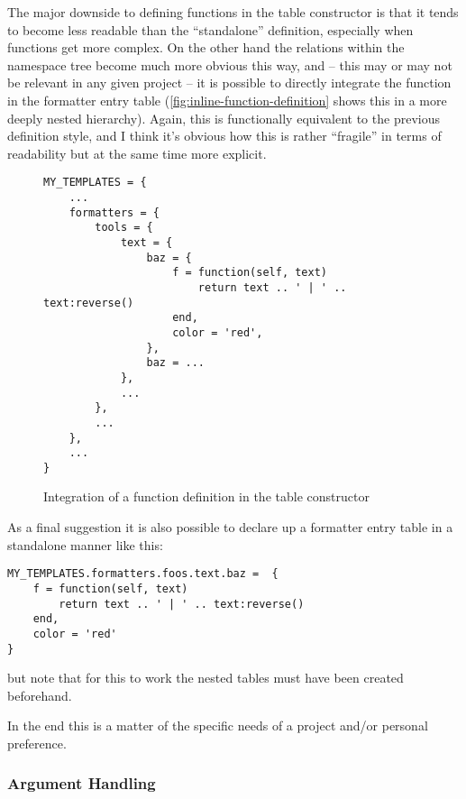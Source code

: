 \documentclass{scrartcl}
\begin{document}
The major downside to defining functions in the table constructor is that it
tends to become less readable than the “standalone” definition, especially when
functions get more complex.  On the other hand the relations within the
namespace tree become much more obvious this way, and -- this may or may not be
relevant in any given project -- it is possible to directly integrate the
function in the formatter entry table (\vref{fig:inline-function-definition}
shows this in a more deeply nested hierarchy). Again, this is functionally
equivalent to the previous definition style, and I think it's obvious how this
is rather “fragile” in terms of readability but at the same time more explicit.

\begin{figure}
\begin{verbatim}
MY_TEMPLATES = {
    ...
    formatters = {
        tools = {
            text = {
                baz = {
                    f = function(self, text)
                        return text .. ' | ' .. text:reverse()
                    end,
                    color = 'red',
                },
                baz = ...
            },
            ...
        },
        ...
    },
    ...
}
\end{verbatim}
\caption{Integration of a function definition in the table constructor}
\label{fig:inline-function-definition}
\end{figure}

As a final suggestion it is also possible to declare up a formatter entry table in a standalone manner like this:


\begin{verbatim}
MY_TEMPLATES.formatters.foos.text.baz =  {
	f = function(self, text)
		return text .. ' | ' .. text:reverse()
	end,
	color = 'red'
}
\end{verbatim}

\noindent but note that for this to work the nested tables
 must have been created beforehand.

In the end this is a matter of the specific needs of a project and/or personal
preference.



\subsubsection{Argument Handling}
\label{sec:functions-argument-handling}
\end{document}
